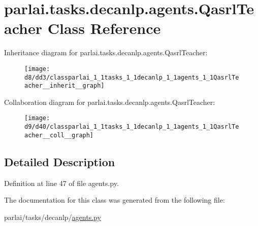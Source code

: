 \hypertarget{classparlai_1_1tasks_1_1decanlp_1_1agents_1_1QasrlTeacher}{}\section{parlai.\+tasks.\+decanlp.\+agents.\+Qasrl\+Teacher Class Reference}
\label{classparlai_1_1tasks_1_1decanlp_1_1agents_1_1QasrlTeacher}


Inheritance diagram for parlai.\+tasks.\+decanlp.\+agents.\+Qasrl\+Teacher\+:\nopagebreak
\begin{figure}[H]
\begin{center}
\leavevmode
\texttt{[image: d8/dd3/classparlai\_1\_1tasks\_1\_1decanlp\_1\_1agents\_1\_1QasrlTeacher\_\_inherit\_\_graph]}
\end{center}
\end{figure}


Collaboration diagram for parlai.\+tasks.\+decanlp.\+agents.\+Qasrl\+Teacher\+:\nopagebreak
\begin{figure}[H]
\begin{center}
\leavevmode
\texttt{[image: d9/d40/classparlai\_1\_1tasks\_1\_1decanlp\_1\_1agents\_1\_1QasrlTeacher\_\_coll\_\_graph]}
\end{center}
\end{figure}


\subsection{Detailed Description}


Definition at line 47 of file agents.\+py.



The documentation for this class was generated from the following file\+:\begin{DoxyCompactItemize}
\item 
parlai/tasks/decanlp/\hyperlink{parlai_2tasks_2decanlp_2agents_8py}{agents.\+py}\end{DoxyCompactItemize}
